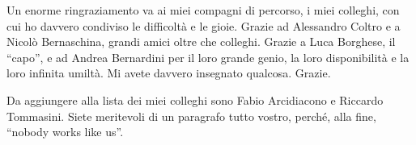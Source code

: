 Un enorme ringraziamento va ai miei compagni di percorso, i miei colleghi, con cui ho davvero condiviso le difficoltà e le gioie. Grazie ad Alessandro Coltro e a Nicolò Bernaschina, grandi amici oltre che colleghi. Grazie a Luca Borghese, il ``capo'', e ad Andrea Bernardini per il loro grande genio, la loro disponibilità e la loro infinita umiltà. Mi avete davvero insegnato qualcosa. Grazie.

Da aggiungere alla lista dei miei colleghi sono Fabio Arcidiacono e Riccardo Tommasini. Siete meritevoli di un paragrafo tutto vostro, perché, alla fine, ``nobody works like us''.